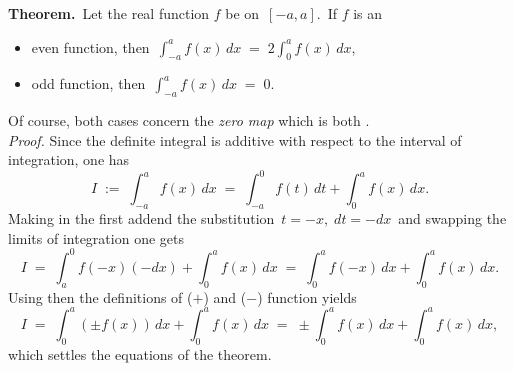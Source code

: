 \documentclass[12pt]{article}
\theoremstyle{definition}
\begin{document}
\textbf{Theorem.}\, Let the real function $f$ be 
 on\, 
$[-a, a]$.\, If $f$ is an
\begin{itemize}
\item even function, then\, 
$\displaystyle \int_{-a}^a{f(x)}\,dx \;=\; 2\int_0^a f(x)\,dx$,
\item odd function, then\, 
$\displaystyle \int_{-a}^a f(x)\,dx \;=\; 0.$
\end{itemize}
Of course, both cases concern the {\it zero map} which is both 
.\\

{\it Proof.} Since the definite integral is additive with respect to the interval of integration, one has 
$$I \;:=\; \int_{-a}^a f(x)\,dx 
\;=\; \int_{-a}^0 f(t)\,dt+\int_0^a f(x)\,dx.$$
Making in the first addend the substitution\, $t = -x,\; dt = -dx$\, and swapping the limits of integration one gets
$$I \;=\; \int_a^0 f(-x)(-dx)+\int_0^a f(x)\,dx 
\;=\; \int_0^a f(-x)\,dx+\int_0^a f(x)\,dx.$$
Using then the definitions of  ($+$) and  ($-$) function yields
$$I\;=\; \int_0^a\!(\pm f(x))\,dx+\!\int_0^a\!f(x)\,dx 
\;=\; \pm\!\int_0^a\!f(x)\,dx+\!\int_0^a\!f(x)\,dx,$$
which settles the equations of the theorem.



\end{document}
